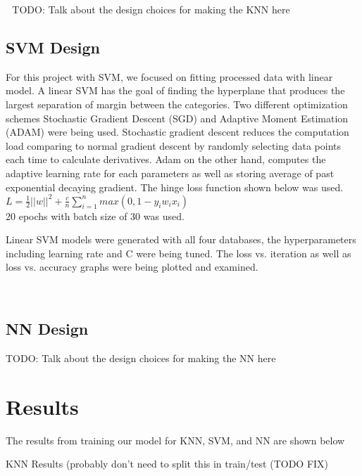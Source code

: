 \documentclass[letterpaper, 12 pt, conference]{ieeeconf}  %
\begin{document}
\newline \,\,
\nelwine TODO: Talk about the design choices for making the KNN here
\newline \,\,

\subsection{SVM Design}
For this project with SVM, we focused on fitting processed data with linear model. A linear SVM has the goal of finding the hyperplane that produces the largest separation of margin between the categories. Two different optimization schemes Stochastic Gradient Descent (SGD) and Adaptive Moment Estimation (ADAM) were being used. Stochastic gradient descent reduces the computation load comparing to normal gradient descent by randomly selecting data points each time to calculate derivatives. Adam on the other hand, computes the adaptive learning rate for each parameters as well as storing average of past exponential decaying gradient. The hinge loss function shown below was used.\\
$L = \frac{1}{2} ||w||^2 + \frac{c}{n}\sum_{i=1}^{n}max(0,1-y_iw_ix_i) $\\
20 epochs with batch size of 30 was used. 

Linear SVM models were generated with all four databases, the hyperparameters including learning rate and C were being tuned. The loss vs. iteration as well as loss vs. accuracy graphs were being plotted and examined. 

\newline \,\,

\subsection{NN Design}

TODO: Talk about the design choices for making the NN here
\newline \,\,


\section{Results}

The results from training our model for KNN, SVM, and NN are shown below
\newline \,\,

\par KNN Results (probably don't need to split this in train/test (TODO FIX)
\end{document}
